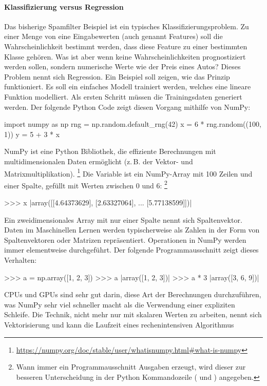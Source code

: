 \paragraph{Klassifizierung versus Regression}
Das bisherige Spamfilter Beispiel ist ein typisches
Klassifizierungsproblem. Zu einer Menge von eine Eingabewerten
(auch genannt Features) soll die Wahrscheinlichkeit bestimmt werden,
dass diese Feature zu einer bestimmten Klasse gehören.
Was ist aber wenn keine Wahrscheinlichkeiten
prognostiziert werden sollen, sondern numerische Werte wie
der Preis eines Autos? Dieses Problem nennt sich Regression.
Ein Beispiel soll zeigen, wie das Prinzip funktioniert.
Es soll ein einfaches Modell trainiert werden, welches eine lineare
Funktion modelliert. Als ersten Schritt müssen die Trainingsdaten generiert werden.
Der folgende Python Code zeigt diesen Vorgang mithilfe von NumPy:
\begin{pythoncode}
import numpy as np
rng = np.random.default_rng(42)
x = 6 * rng.random((100, 1))
y = 5 + 3 * x
\end{pythoncode}
NumPy ist eine Python Bibliothek, die effiziente Berechnungen mit
multidimensionalen Daten ermöglicht (z.\,B. der Vektor- und Matrixmultiplikation).
\footnote{\url{https://numpy.org/doc/stable/user/whatisnumpy.html\#what-is-numpy}}
Die Variable  ist ein NumPy-Array mit 100 Zeilen und einer Spalte,
gefüllt mit Werten zwischen 0 und 6:
\footnote{Wann immer ein Programmausschnitt Ausgaben erzeugt, wird
dieser zur besseren Unterscheidung in der Python Kommandozeile
(\pythoninline{>>>} und ) angegeben.}
\begin{pythoncode}
>>> x
|array([[4.64373629],
       [2.63327064],
       ...
       [5.77138599]])|
\end{pythoncode}
Ein zweidimensionales Array mit nur einer Spalte nennt sich Spaltenvektor.
Daten im Maschinellen Lernen werden typischerweise als Zahlen in der Form
von Spaltenvektoren oder Matrizen repräsentiert.
Operationen in NumPy werden immer elementweise durchgeführt. Der folgende Programmausschnitt
zeigt dieses Verhalten:
\begin{pythoncode}
>>> a = np.array([1, 2, 3])
>>> a
|array([1, 2, 3])|
>>> a * 3
|array([3, 6, 9])|
\end{pythoncode}
CPUs und GPUs sind sehr gut darin, diese Art der Berechnungen durchzuführen,
was NumPy sehr viel schneller macht als die Verwendung einer expliziten Schleife.
Die Technik, nicht mehr nur mit skalaren Werten zu arbeiten,
nennt sich Vektorisierung und kann
die Laufzeit eines rechenintensiven Algorithmus
